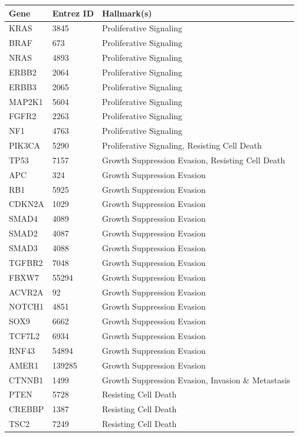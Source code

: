 \documentclass[
  11pt,
]{article}
\newcounter{none} %
\begin{document}
{\def\LTcaptype{none} %
\begin{longtable}[]{@{}lll@{}}
\toprule\noalign{}
Gene & Entrez ID & Hallmark(s) \\
\midrule\noalign{}
\endhead
\bottomrule\noalign{}
\endlastfoot
KRAS & 3845 & Proliferative Signaling \\
BRAF & 673 & Proliferative Signaling \\
NRAS & 4893 & Proliferative Signaling \\
ERBB2 & 2064 & Proliferative Signaling \\
ERBB3 & 2065 & Proliferative Signaling \\
MAP2K1 & 5604 & Proliferative Signaling \\
FGFR2 & 2263 & Proliferative Signaling \\
NF1 & 4763 & Proliferative Signaling \\
PIK3CA & 5290 & Proliferative Signaling, Resisting Cell Death \\
TP53 & 7157 & Growth Suppression Evasion, Resisting Cell Death \\
APC & 324 & Growth Suppression Evasion \\
RB1 & 5925 & Growth Suppression Evasion \\
CDKN2A & 1029 & Growth Suppression Evasion \\
SMAD4 & 4089 & Growth Suppression Evasion \\
SMAD2 & 4087 & Growth Suppression Evasion \\
SMAD3 & 4088 & Growth Suppression Evasion \\
TGFBR2 & 7048 & Growth Suppression Evasion \\
FBXW7 & 55294 & Growth Suppression Evasion \\
ACVR2A & 92 & Growth Suppression Evasion \\
NOTCH1 & 4851 & Growth Suppression Evasion \\
SOX9 & 6662 & Growth Suppression Evasion \\
TCF7L2 & 6934 & Growth Suppression Evasion \\
RNF43 & 54894 & Growth Suppression Evasion \\
AMER1 & 139285 & Growth Suppression Evasion \\
CTNNB1 & 1499 & Growth Suppression Evasion, Invasion \& Metastasis \\
PTEN & 5728 & Resisting Cell Death \\
CREBBP & 1387 & Resisting Cell Death \\
TSC2 & 7249 & Resisting Cell Death \\

\end{longtable}}
\end{document}
